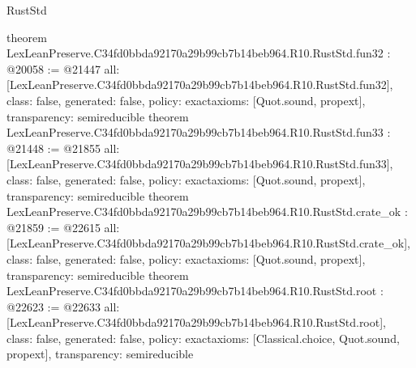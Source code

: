 \begin{lexlean}{RustStd}
\begin{coremodule}
{}
theorem LexLeanPreserve.C34fd0bbda92170a29b99cb7b14beb964.R10.RustStd.fun32 : @20058 := @21447 {
  all: [LexLeanPreserve.C34fd0bbda92170a29b99cb7b14beb964.R10.RustStd.fun32],
  class: false,
  generated: false,
  policy: exact{axioms: [Quot.sound, propext]},
  transparency: semireducible
}
theorem LexLeanPreserve.C34fd0bbda92170a29b99cb7b14beb964.R10.RustStd.fun33 : @21448 := @21855 {
  all: [LexLeanPreserve.C34fd0bbda92170a29b99cb7b14beb964.R10.RustStd.fun33],
  class: false,
  generated: false,
  policy: exact{axioms: [Quot.sound, propext]},
  transparency: semireducible
}
theorem LexLeanPreserve.C34fd0bbda92170a29b99cb7b14beb964.R10.RustStd.crate_ok : @21859 := @22615 {
  all: [LexLeanPreserve.C34fd0bbda92170a29b99cb7b14beb964.R10.RustStd.crate_ok],
  class: false,
  generated: false,
  policy: exact{axioms: [Quot.sound, propext]},
  transparency: semireducible
}
theorem LexLeanPreserve.C34fd0bbda92170a29b99cb7b14beb964.R10.RustStd.root : @22623 := @22633 {
  all: [LexLeanPreserve.C34fd0bbda92170a29b99cb7b14beb964.R10.RustStd.root],
  class: false,
  generated: false,
  policy: exact{axioms: [Classical.choice, Quot.sound, propext]},
  transparency: semireducible
}


\end{coremodule}
\end{lexlean}
